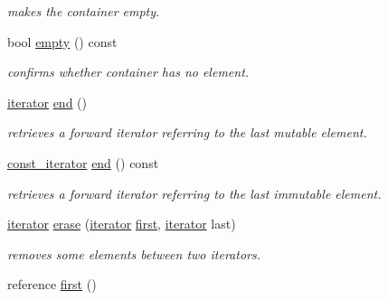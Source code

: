 \begin{DoxyCompactItemize}
\begin{DoxyCompactList}\small\item\em makes the container empty. \end{DoxyCompactList}\item 
\hypertarget{classhryky_1_1_vector_a0aec03015ecda2ed9e59f7a95ee2c81a}{bool \hyperlink{classhryky_1_1_vector_a0aec03015ecda2ed9e59f7a95ee2c81a}{empty} () const }\label{classhryky_1_1_vector_a0aec03015ecda2ed9e59f7a95ee2c81a}

\begin{DoxyCompactList}\small\item\em confirms whether container has no element. \end{DoxyCompactList}\item 
\hypertarget{classhryky_1_1_vector_ae17851e0d811d052645dd6e5a507f365}{\hyperlink{classhryky_1_1iterator_1_1random_1_1_mutable}{iterator} \hyperlink{classhryky_1_1_vector_ae17851e0d811d052645dd6e5a507f365}{end} ()}\label{classhryky_1_1_vector_ae17851e0d811d052645dd6e5a507f365}

\begin{DoxyCompactList}\small\item\em retrieves a forward iterator referring to the last mutable element. \end{DoxyCompactList}\item 
\hypertarget{classhryky_1_1_vector_acd3e720b6a359bb00873e0de3d6229d6}{\hyperlink{classhryky_1_1iterator_1_1random_1_1_immutable}{const\-\_\-iterator} \hyperlink{classhryky_1_1_vector_acd3e720b6a359bb00873e0de3d6229d6}{end} () const }\label{classhryky_1_1_vector_acd3e720b6a359bb00873e0de3d6229d6}

\begin{DoxyCompactList}\small\item\em retrieves a forward iterator referring to the last immutable element. \end{DoxyCompactList}\item 
\hypertarget{classhryky_1_1_vector_ad52743101f866882512ab84704f07ba1}{\hyperlink{classhryky_1_1iterator_1_1random_1_1_mutable}{iterator} \hyperlink{classhryky_1_1_vector_ad52743101f866882512ab84704f07ba1}{erase} (\hyperlink{classhryky_1_1iterator_1_1random_1_1_mutable}{iterator} \hyperlink{classhryky_1_1_vector_ad7e5eb625467631e061a979bd2060f78}{first}, \hyperlink{classhryky_1_1iterator_1_1random_1_1_mutable}{iterator} last)}\label{classhryky_1_1_vector_ad52743101f866882512ab84704f07ba1}

\begin{DoxyCompactList}\small\item\em removes some elements between two iterators. \end{DoxyCompactList}\item 
\hypertarget{classhryky_1_1_vector_ad7e5eb625467631e061a979bd2060f78}{reference \hyperlink{classhryky_1_1_vector_ad7e5eb625467631e061a979bd2060f78}{first} ()}\label{classhryky_1_1_vector_ad7e5eb625467631e061a979bd2060f78}


\end{DoxyCompactItemize}
